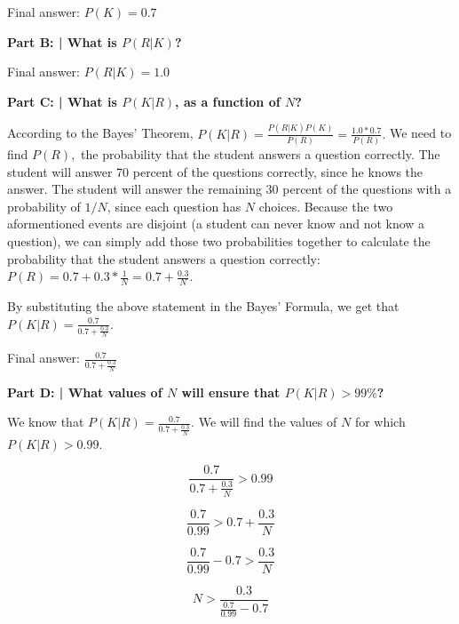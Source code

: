 \documentclass{article}
\begin{document}
 Final answer: $P(K) = 0.7$\newline
 
 \textbf{Part B: | What is $P(R | K)$?}\newline
 
 Final answer: $P(R | K) = 1.0$\newline
 
 \textbf{Part C: | What is $P(K | R)$, as a function of $N$?}\newline
 
 According to the Bayes' Theorem, $P(K | R) = \frac{P(R | K)P(K)}{P(R)} = \frac{1.0 * 0.7}{P(R)}.$ We need to find  $P(R),$ the probability that the student answers a question correctly. The student will answer 70 percent of the questions correctly, since he knows the answer. The student will answer the remaining 30 percent of the questions with a probability of $1/N$, since each question has $N$ choices. Because the two aformentioned events are disjoint (a student can never know and not know a question), we can simply add those two probabilities together to calculate the probability that the student answers a question correctly: $P(R) = 0.7 + 0.3*\frac{1}{N} = 0.7 + \frac{0.3}{N}$.\newline
 
 By substituting the above statement in the Bayes' Formula, we get that $P(K | R) = \frac{0.7}{ 0.7 + \frac{0.3}{N}}$.
 
 Final answer: $\frac{0.7}{0.7 + \frac{0.3}{N}}$\newline
 
 \textbf{Part D: | What values of $N$ will ensure that $P(K | R) > 99\%$?}\newline
 
 We know that $P(K | R) = \frac{0.7}{ 0.7 + \frac{0.3}{N}}$. We will find the values of $N$ for which $P(K | R) > 0.99$.
 
 \begin{displaymath}
    \frac{0.7}{0.7 + \frac{0.3}{N}} > 0.99
 \end{displaymath}
 
 \begin{displaymath}
    \frac{0.7}{0.99} > 0.7 + \frac{0.3}{N}
 \end{displaymath}
 
 \begin{displaymath}
    \frac{0.7}{0.99} - 0.7 > \frac{0.3}{N}
 \end{displaymath}
 
 \begin{displaymath}
    N > \frac{0.3}{\frac{0.7}{0.99} - 0.7}
 \end{displaymath}
 
\end{document}
